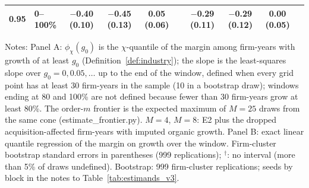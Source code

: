 \begin{table}[t]
{\begin{tabular}{llcccccccc}
0.95 & 0--100\% & $-$0.40 (0.10) & $-$0.45 (0.13) & 0.05 (0.06) & & $-$0.29 (0.11) & $-$0.29 (0.12) & 0.00 (0.05) & \\
\bottomrule\end{tabular}}
\par\vspace{2pt}\footnotesize\raggedright Notes: Panel A: $\phi_\chi(g_0)$ is the $\chi$-quantile of the margin among firm-years with growth of at least $g_0$ (Definition~\ref{def:industry}); the slope is the least-squares slope over $g_0=0,0.05,\dots$ up to the end of the window, defined when every grid point has at least 30 firm-years in the sample (10 in a bootstrap draw); windows ending at 80 and 100\% are not defined because fewer than 30 firm-years grow at least 80\%. The order-$m$ frontier is the expected maximum of $M=25$ draws from the same cone (estimate\_frontier.py). $M=4$, $M=8$: E2 plus the dropped acquisition-affected firm-years with imputed organic growth. Panel B: exact linear quantile regression of the margin on growth over the window. Firm-cluster bootstrap standard errors in parentheses (999 replications); $^\dagger$: no interval (more than 5\% of draws undefined). Bootstrap: 999 firm-cluster replications; seeds by block in the notes to Table~\ref{tab:estimands_v3}.
\end{table}
